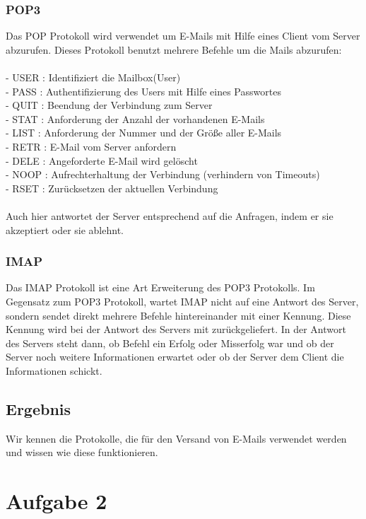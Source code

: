 \subsubsection{POP3}
Das POP Protokoll wird verwendet um E-Mails mit Hilfe eines Client vom Server abzurufen. Dieses Protokoll benutzt mehrere Befehle um die Mails abzurufen: \\
\\
- USER : Identifiziert die Mailbox(User)\\
- PASS : Authentifizierung des Users mit Hilfe eines Passwortes\\
- QUIT :  Beendung der Verbindung zum Server\\
- STAT : Anforderung der Anzahl der vorhandenen E-Mails\\
- LIST : Anforderung der Nummer und der Größe aller E-Mails\\
- RETR : E-Mail vom Server anfordern\\
- DELE : Angeforderte E-Mail wird gelöscht\\
- NOOP : Aufrechterhaltung der Verbindung (verhindern von Timeouts)\\
- RSET : Zurücksetzen der aktuellen Verbindung\\
\\
Auch hier antwortet der Server entsprechend auf die Anfragen, indem er sie akzeptiert oder sie ablehnt.

\subsubsection{IMAP}
Das IMAP Protokoll ist eine Art Erweiterung des POP3 Protokolls. Im Gegensatz zum POP3 Protokoll, wartet IMAP nicht auf eine Antwort des Server, sondern sendet direkt mehrere Befehle hintereinander mit einer Kennung. Diese Kennung wird bei der Antwort des Servers mit zurückgeliefert. In der Antwort des Servers steht dann, ob Befehl ein Erfolg oder Misserfolg war und ob der Server noch weitere Informationen erwartet oder ob der Server dem Client die Informationen schickt. 

\subsection{Ergebnis}
Wir kennen die Protokolle, die für den Versand von E-Mails verwendet werden und wissen wie diese funktionieren.

\section{Aufgabe 2}

